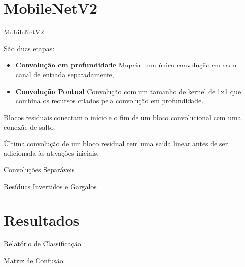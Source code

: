 \documentclass[10pt, compress]{beamer}
\begin{document}
\section{MobileNetV2} %
\begin{frame}{MobileNetV2}
  \begin{description}
    \centering
    \item[Convoluções Separáveis em Profundidade] São duas etapas:
          \begin{itemize}
          \item {\bf Convolução em profundidade} Mapeia uma única convolução em cada canal de entrada separadamente,
          \item {\bf Convolução Pontual} Convolução com um tamanho de kernel de 1x1 que combina os recursos criados pela convolução em profundidade.
          \end{itemize}
    \item[Resíduos Invertidos] Blocos residuais conectam o início e o fim de um bloco convolucional com uma conexão de salto.
    \item[Gargalos] Última convolução de um bloco residual tem uma saída linear antes de ser adicionada às ativações iniciais.
  \end{description}
\end{frame}





\begin{frame}{Convoluções Separáveis}


\end{frame}

\begin{frame}{Resíduos Invertidos e Gargalos}


\end{frame}

\section{Resultados}
\begin{frame}{Relatório de Classificação}


\end{frame}

\begin{frame}{Matriz de Confusão}


\end{frame}


\end{document}
